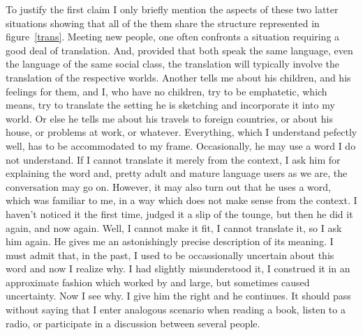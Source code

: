 \documentclass[10pt]{article}
\newcommand{\<}{\langle}
\renewcommand{\>}{\rangle}
\begin{document}
To justify the first claim I only briefly mention the aspects of these two 
latter situations showing that all of the them share the structure represented 
in figure~\ref{trans}. Meeting new people, one often confronts a situation 
requiring a good deal of translation. And, provided that both speak the 
same language, even the language of the same social class, the translation 
will typically involve the translation of the respective worlds. Another 
tells me about his children, and his feelings for them, and I, who have no 
children, try to be emphatetic, which means, try to translate the setting 
he is sketching and incorporate it into my world. Or else he tells me about
his travels to foreign countries, or about his house, or problems at work, 
or whatever. Everything, which I understand pefectly well, has to be 
accommodated to my frame. Occasionally, he may use a word I do not 
understand. If I cannot translate it merely from the context, I ask him 
for explaining the word and, pretty adult and mature language users as we 
are, the conversation may go on. However, it may also turn out that he 
uses a word, which was familiar to me, in a way which does not make sense 
from the context. I haven't noticed it the first time, judged it a slip of 
the tounge, but then he did it again, and now again. Well, I cannot make it 
fit, I cannot translate it, so I ask him again. He gives me an 
astonishingly precise description of its meaning. I must admit that, in 
the past, I used to be occassionally uncertain about this word and now I 
realize why. I had slightly misunderstood it, I construed it in an 
approximate fashion which worked by and large, but sometimes caused 
uncertainty. Now I see why. I give him the right and he continues. It 
should pass without saying that I enter analogous scenario when reading a 
book, listen to a radio, or participate in a discussion between several 
people.
\end{document}
